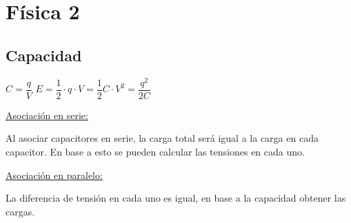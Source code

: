 \section{Física 2}

\subsection{Capacidad}

\hfil
$C = \dfrac{q}{V}$
\hfil
$E = \dfrac{1}{2}\cdot q \cdot V = \dfrac{1}{2} C \cdot V^2 = \dfrac{q^2}{2C}$
\hfil

\vspace{\baselineskip}
\noindent
\underline{Asociación en serie:}

Al asociar capacitores en serie, la carga total será igual a la carga en cada capacitor. En base a esto se pueden calcular las tensiones en cada uno.

\vspace{\baselineskip}
\noindent
\underline{Asociación en paralelo:}

La diferencia de tensión en cada uno es igual, en base a la capacidad obtener las cargas.
